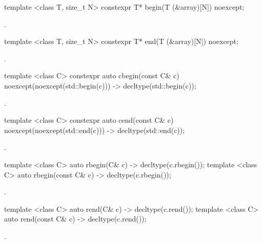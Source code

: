 %
\begin{itemdecl}
template <class T, size_t N> constexpr T* begin(T (&array)[N]) noexcept;
\end{itemdecl}

\begin{itemdescr}
\pnum
\returns {}.
\end{itemdescr}

%
\begin{itemdecl}
template <class T, size_t N> constexpr T* end(T (&array)[N]) noexcept;
\end{itemdecl}

\begin{itemdescr}
\pnum
\returns {}.
\end{itemdescr}

%
\begin{itemdecl}
template <class C> constexpr auto cbegin(const C& c) noexcept(noexcept(std::begin(c)))
  -> decltype(std::begin(c));
\end{itemdecl}
\begin{itemdescr}
\pnum \returns {}.
\end{itemdescr}

%
\begin{itemdecl}
template <class C> constexpr auto cend(const C& c) noexcept(noexcept(std::end(c)))
  -> decltype(std::end(c));
\end{itemdecl}
\begin{itemdescr}
\pnum \returns {}.
\end{itemdescr}

%
\begin{itemdecl}
template <class C> auto rbegin(C& c) -> decltype(c.rbegin());
template <class C> auto rbegin(const C& c) -> decltype(c.rbegin());
\end{itemdecl}
\begin{itemdescr}
\pnum \returns {}.
\end{itemdescr}

%
\begin{itemdecl}
template <class C> auto rend(C& c) -> decltype(c.rend());
template <class C> auto rend(const C& c) -> decltype(c.rend());
\end{itemdecl}
\begin{itemdescr}
\pnum \returns {}.
\end{itemdescr}

